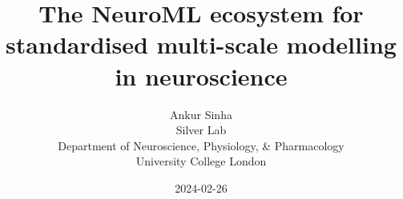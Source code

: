 
\renewcommand{\footnoterule}{}

\title{The NeuroML ecosystem for standardised multi-scale modelling in neuroscience}
\author[Ankur Sinha]{Ankur Sinha\\Silver Lab\\Department of Neuroscience, Physiology, \& Pharmacology\\University College London}
\date{2024-02-26}




\begin{frame}
  \titlepage{}
\end{frame}

